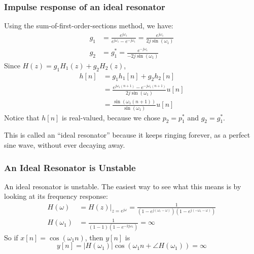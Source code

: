 \documentclass{beamer}
\begin{document}
\begin{frame}
  \frametitle{Impulse response of an ideal resonator}

  Using the sum-of-first-order-sections method, we have:
  \begin{align*}
    g_1 &= \frac{e^{j\omega_1}}{e^{j\omega_1}-e^{-j\omega_1}}=\frac{e^{j\omega_1}}{2j\sin(\omega_1)}\\
    g_2 &= g_1^*=\frac{e^{-j\omega_1}}{-2j\sin(\omega_1)}
  \end{align*}
  Since $H(z)=g_1H_1(z)+g_2H_2(z)$,
  \begin{align*}
    h[n] &= g_1h_1[n] + g_2h_2[n]\\
    &= \frac{e^{j\omega_1(n+1)}-e^{-j\omega_1(n+1)}}{2j\sin(\omega_1)}u[n]\\
    &= \frac{\sin(\omega_1 (n+1))}{\sin(\omega_1)}u[n]
  \end{align*}
  Notice that $h[n]$ is real-valued, because we chose $p_2=p_1^*$ and $g_2=g_1^*$.
  
\end{frame}

\begin{frame}
  This is called an ``ideal resonator'' because it keeps ringing
  forever, as a perfect sine wave, without ever decaying away.
  \centerline{}
\end{frame}

\begin{frame}
  \frametitle{An Ideal  Resonator is Unstable}

  An ideal resonator is unstable.  The easiest way to see what this means is
  by looking at its frequency response:
  \begin{align*}
    H(\omega) &= H(z)\vert_{z=e^{j\omega}} = \frac{1}{(1-e^{j(\omega_1-\omega)})(1-e^{j(-\omega_1-\omega)})}\\
    H(\omega_1) &= \frac{1}{(1-1)(1-e^{-2j\omega_1})} = \infty
  \end{align*}
  So if $x[n]=\cos(\omega_1 n)$, then $y[n]$ is
  \begin{displaymath}
    y[n] = |H(\omega_1)|\cos\left(\omega_1 n+\angle H(\omega_1)\right) = \infty
  \end{displaymath}
\end{frame}

\begin{frame}
  \centerline{}
\end{frame}
\end{document}
